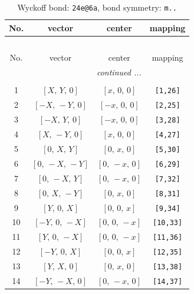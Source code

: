 \documentclass[fleqn,8pt]{jsarticle}
\begin{document}
\begin{longtable}{cccc}
\caption{Wyckoff bond: {\tt 24e@6a}, bond symmetry: {\tt m..}}
 \\
 \hline \hline
No. & vector & center & mapping \\ \hline \endfirsthead

\multicolumn{3}{l}{\tablename\ \thetable{}} \\
 \hline \hline
No. & vector & center & mapping \\ \hline \endhead

 \hline \hline
\multicolumn{3}{r}{\footnotesize\it continued ...} \\ \endfoot

 \hline \hline
\multicolumn{3}{r}{} \\ \endlastfoot

1 & $\left[ X,\, Y,\, 0 \right]$ & $\left[ x,\, 0,\, 0 \right]$ & {\tt [1,26]} \\ \hline
2 & $\left[ - X,\, - Y,\, 0 \right]$ & $\left[ - x,\, 0,\, 0 \right]$ & {\tt [2,25]} \\ \hline
3 & $\left[ - X,\, Y,\, 0 \right]$ & $\left[ - x,\, 0,\, 0 \right]$ & {\tt [3,28]} \\ \hline
4 & $\left[ X,\, - Y,\, 0 \right]$ & $\left[ x,\, 0,\, 0 \right]$ & {\tt [4,27]} \\ \hline
5 & $\left[ 0,\, X,\, Y \right]$ & $\left[ 0,\, x,\, 0 \right]$ & {\tt [5,30]} \\ \hline
6 & $\left[ 0,\, - X,\, - Y \right]$ & $\left[ 0,\, - x,\, 0 \right]$ & {\tt [6,29]} \\ \hline
7 & $\left[ 0,\, - X,\, Y \right]$ & $\left[ 0,\, - x,\, 0 \right]$ & {\tt [7,32]} \\ \hline
8 & $\left[ 0,\, X,\, - Y \right]$ & $\left[ 0,\, x,\, 0 \right]$ & {\tt [8,31]} \\ \hline
9 & $\left[ Y,\, 0,\, X \right]$ & $\left[ 0,\, 0,\, x \right]$ & {\tt [9,34]} \\ \hline
10 & $\left[ - Y,\, 0,\, - X \right]$ & $\left[ 0,\, 0,\, - x \right]$ & {\tt [10,33]} \\ \hline
11 & $\left[ Y,\, 0,\, - X \right]$ & $\left[ 0,\, 0,\, - x \right]$ & {\tt [11,36]} \\ \hline
12 & $\left[ - Y,\, 0,\, X \right]$ & $\left[ 0,\, 0,\, x \right]$ & {\tt [12,35]} \\ \hline
13 & $\left[ Y,\, X,\, 0 \right]$ & $\left[ 0,\, x,\, 0 \right]$ & {\tt [13,38]} \\ \hline
14 & $\left[ - Y,\, - X,\, 0 \right]$ & $\left[ 0,\, - x,\, 0 \right]$ & {\tt [14,37]} \\ \hline

\end{longtable}
\end{document}

